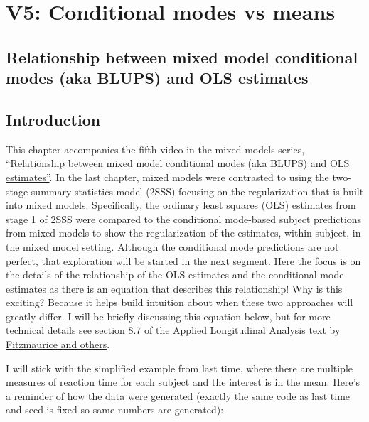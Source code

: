 \documentclass[
]{book}
\begin{document}
\hypertarget{v5-conditional-modes-vs-means}{%
\chapter{V5: Conditional modes vs means}\label{v5-conditional-modes-vs-means}}

\hypertarget{relationship-between-mixed-model-conditional-modes-aka-blups-and-ols-estimates}{%
\section{Relationship between mixed model conditional modes (aka BLUPS) and OLS estimates}\label{relationship-between-mixed-model-conditional-modes-aka-blups-and-ols-estimates}}

\hypertarget{introduction-3}{%
\section{Introduction}\label{introduction-3}}

This chapter accompanies the fifth video in the mixed models series, \href{https://youtu.be/QqEUKlKPos4}{``Relationship between mixed model conditional modes (aka BLUPS) and OLS estimates''}.
In the last chapter, mixed models were contrasted to using the two-stage summary statistics model (2SSS) focusing on the regularization that is built into mixed models. Specifically, the ordinary least squares (OLS) estimates from stage 1 of 2SSS were compared to the conditional mode-based subject predictions from mixed models to show the regularization of the estimates, within-subject, in the mixed model setting. Although the conditional mode predictions are not perfect, that exploration will be started in the next segment. Here the focus is on the details of the relationship of the OLS estimates and the conditional mode estimates as there is an equation that describes this relationship! Why is this exciting? Because it helps build intuition about when these two approaches will greatly differ. I will be briefly discussing this equation below, but for more technical details see section 8.7 of the \href{https://www.amazon.com/Applied-Longitudinal-Analysis-Garrett-Fitzmaurice/dp/0470380276}{Applied Longitudinal Analysis text by Fitzmaurice and others}.

I will stick with the simplified example from last time, where there are multiple measures of reaction time for each subject and the interest is in the mean. Here's a reminder of how the data were generated (exactly the same code as last time and seed is fixed so same numbers are generated):
\end{document}
